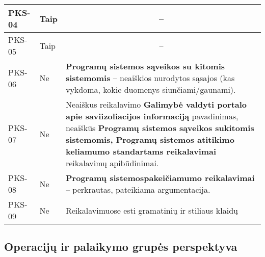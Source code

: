 \documentclass{VUMIFPSkursinis}
\begin{document}
\begin{center}
\begin{longtable}{|C{2cm}|L{2.5cm}|L{10cm}|}
		PKS-04                                          &
		Taip                                            &
		                                                                                                                                                                                                                                           \\ \hline
		PKS-05                                          &
		Taip                                              &
		     \\ \hline
		PKS-06                                          &
		Ne                                              &
		\textbf{Programų sistemos sąveikos su kitomis sistemomis} -- neaiškios nurodytos sąsajos (kas vykdoma, kokie duomenys siunčiami/gaunami). \\ \hline
		PKS-07                                          &
		Ne                                              &
		Neaiškus reikalavimo \textbf{Galimybė valdyti portalo apie saviizoliacijos informaciją} pavadinimas, neaiškūs \textbf{Programų sistemos sąveikos sukitomis sistemomis, Programų sistemos atitikimo keliamumo standartams reikalavimai} reikalavimų apibūdinimai.                                                                                                                                                                                             \\ \hline
		PKS-08                                          &
		Ne                                              &
		\textbf{Programų sistemospakeičiamumo reikalavimai} -- perkrautas, pateikiama argumentacija.                                                                                                                                                                                \\ \hline
		PKS-09                                          &
		Ne                                            &
		Reikalavimuose esti gramatinių ir stiliaus klaidų                                                                                                                                                                                                                                           \\ \hline
	\end{longtable}
\end{center}

\subsection{Operacijų ir palaikymo grupės perspektyva}
\end{document}
